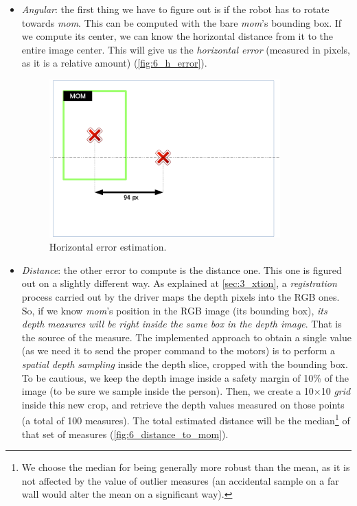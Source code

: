 		\begin{itemize}
			\item \emph{Angular}: the first thing we have to figure out is if the robot has to rotate towards \emph{mom}. This can be computed with the bare \emph{mom}'s bounding box. If we compute its center, we can know the horizontal distance from it to the entire image center. This will give us the \emph{horizontal error} (measured in pixels, as it is a relative amount) (\autoref{fig:6_h_error}).
			
			\begin{figure}[h]
				\centering
				\includegraphics[width=3.5in]{images/h_error}
				\caption{Horizontal error estimation.}
				\label{fig:6_h_error}
			\end{figure}
			
			\item \emph{Distance}: the other error to compute is the distance one. This one is figured out on a slightly different way. As explained at \autoref{sec:3_xtion}, a \emph{registration} process carried out by the driver maps the depth pixels into the RGB ones. So, if we know \emph{mom}'s position in the RGB image (its bounding box), \emph{its depth measures will be right inside the same box in the depth image}. That is the source of the measure. The implemented approach to obtain a single value (as we need it to send the proper command to the motors) is to perform a \emph{spatial depth sampling} inside the depth slice, cropped with the bounding box. To be cautious, we keep the depth image inside a safety margin of 10\% of the image (to be sure we sample inside the person). Then, we create a 10$\times$10 \emph{grid} inside this new crop, and retrieve the depth values measured on those points (a total of 100 measures). The total estimated distance will be the median\footnote{We choose the median for being generally more robust than the mean, as it is not affected by the value of outlier measures (an accidental sample on a far wall would alter the mean on a significant way).} of that set of measures (\autoref{fig:6_distance_to_mom}).
			

\end{itemize}
